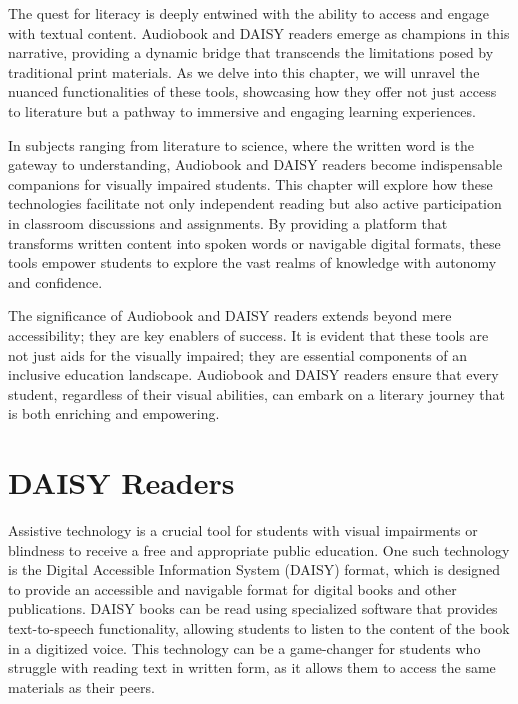 \documentclass[14pt,letterpaper,twoside]{extreport}
\begin{document}
The quest for literacy is deeply entwined with the ability to access and engage with textual content. Audiobook and DAISY readers emerge as champions in this narrative, providing a dynamic bridge that transcends the limitations posed by traditional print materials. As we delve into this chapter, we will unravel the nuanced functionalities of these tools, showcasing how they offer not just access to literature but a pathway to immersive and engaging learning experiences.

In subjects ranging from literature to science, where the written word is the gateway to understanding, Audiobook and DAISY readers become indispensable companions for visually impaired students. This chapter will explore how these technologies facilitate not only independent reading but also active participation in classroom discussions and assignments. By providing a platform that transforms written content into spoken words or navigable digital formats, these tools empower students to explore the vast realms of knowledge with autonomy and confidence.

The significance of Audiobook and DAISY readers extends beyond mere accessibility; they are key enablers of success. It is evident that these tools are not just aids for the visually impaired; they are essential components of an inclusive education landscape. Audiobook and DAISY readers ensure that every student, regardless of their visual abilities, can embark on a literary journey that is both enriching and empowering.

\hypertarget{text-to-speech-music-podcast}{}\section{DAISY Readers}\label{text-to-speech-music-podcast}

Assistive technology is a crucial tool for students with visual impairments or blindness to receive a free and appropriate public education. One such technology is the Digital Accessible Information System (DAISY) format, which is designed to provide an accessible and navigable format for digital books and other publications. DAISY books can be read using specialized software that provides text-to-speech functionality, allowing students to listen to the content of the book in a digitized voice. This technology can be a game-changer for students who struggle with reading text in written form, as it allows them to access the same materials as their peers.
\end{document}
